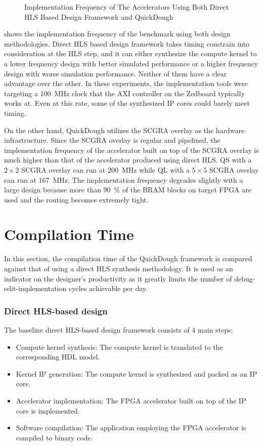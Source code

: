 \begin{figure}
\caption{Implementation Frequency of The Accelerators Using Both Direct HLS Based Design Framework and QuickDough}
\label{fig:impl-freq}
\end{figure}

 shows the implementation frequency of the benchmark using both design
methodologies. Direct HLS based design framework takes timing constrain into consideration at the
HLS step, and it can either synthesize the compute kernel to a lower frequency design with better
simulated performance or a higher frequency design with worse simulation performance. Neither of
them have a clear advantage over the other.  In these experiments, the implementation tools were
targeting a \SI{100}{\mega\hertz} clock that the AXI controller on the Zedboard typically works at.
Even at this rate, some of the synthesized IP cores could barely meet timing.

On the other hand, QuickDough utilizes the SCGRA overlay as the hardware infrastructure. Since the
SCGRA overlay is regular and pipelined, the implementation frequency of the accelerator built on top
of the SCGRA overlay is much higher than that of the accelerator produced using direct HLS. QS with
a $2\times 2$ SCGRA overlay can run at \SI{200}{\mega\hertz} while QL with a $5 \times 5$ SCGRA
overlay can run at \SI{167}{\mega\hertz}. The implementation frequency degrades slightly
with a large design because more than \SI{90}{\percent} of the BRAM blocks on target FPGA are used
and the routing becomes extremely tight. 

\section{Compilation Time} \label{sec:compilation}
In this section, the compilation time of the QuickDough framework is compared against that of using a direct HLS synthesis methodology.  It is used as an indicator on the designer's productivity as it greatly limits the number of debug-edit-implementation cycles achievable per day.

\subsubsection{Direct HLS-based design}
The baseline direct HLS-based design framework consists of 4 main steps:
 
\begin{itemize}[label=\textbullet,leftmargin=2em,rightmargin=\leftmargin]
\item Compute kernel synthesis: The compute kernel is translated to the corresponding HDL model.
\item Kernel IP generation: The compute kernel is synthesized and packed as an IP core.
\item Accelerator implementation: The FPGA accelerator built on top of the IP core is implemented. 
\item Software compilation: The application employing the FPGA accelerator is compiled to binary code.
\end{itemize}

